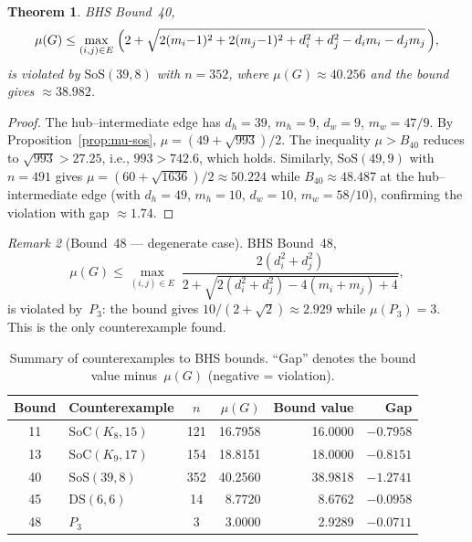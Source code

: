 \documentclass[preprint,12pt]{elsarticle}
\newtheorem{theorem}{Theorem}[section]
\theoremstyle{definition}
\theoremstyle{remark}
\newtheorem{remark}[theorem]{Remark}
\newcommand{\SoC}{\mathrm{SoC}}       %
\newcommand{\SoS}{\mathrm{SoS}}       %
\newcommand{\DS}{\mathrm{DS}}          %
\newcommand{\Lspec}{\mu}               %
\begin{document}

\begin{theorem}\label{thm:bound40}
  BHS Bound~40,
  \begin{equation}\label{eq:bound40}
    \Lspec(G) \leq \max_{(i,j) \in E}\; \Bigl(2 + \sqrt{2(m_i{-}1)^2 + 2(m_j{-}1)^2
      + d_i^2 + d_j^2 - d_i m_i - d_j m_j}\,\Bigr),
  \end{equation}
  is violated by $\SoS(39, 8)$ with $n = 352$, where
  $\Lspec(G) \approx 40.256$ and the bound gives $\approx 38.982$.
\end{theorem}

\begin{proof}
  The hub--intermediate edge has $d_h = 39$, $m_h = 9$,
  $d_w = 9$, $m_w = 47/9$. By Proposition~\ref{prop:mu-sos},
  $\Lspec = (49 + \sqrt{993})/2$. The inequality
  $\Lspec > B_{40}$ reduces to $\sqrt{993} > 27.25$, i.e.,
  $993 > 742.6$, which holds.
  Similarly, $\SoS(49, 9)$ with $n = 491$ gives
  $\Lspec = (60 + \sqrt{1636})/2 \approx 50.224$
  while $B_{40} \approx 48.487$ at the hub--intermediate edge
  (with $d_h = 49$, $m_h = 10$, $d_w = 10$, $m_w = 58/10$),
  confirming the violation with gap $\approx 1.74$.
\end{proof}



\begin{remark}[Bound~48 --- degenerate case]\label{rem:bound48}
  BHS Bound~48,
  \[
    \Lspec(G) \leq \max_{(i,j) \in E}\;
    \frac{2(d_i^2 + d_j^2)}{2 + \sqrt{2(d_i^2 + d_j^2) - 4(m_i + m_j) + 4}},
  \]
  is violated by~$P_3$: the bound gives $10/(2{+}\sqrt{2}) \approx 2.929$
  while $\Lspec(P_3) = 3$. This is the only counterexample found.
\end{remark}



\begin{table}[t]
  \centering
  \caption{Summary of counterexamples to BHS bounds. ``Gap'' denotes
    the bound value minus~$\Lspec(G)$ (negative = violation).}
  \label{tab:counterexamples}
  \begin{tabular}{clcrrr}
    \toprule
    Bound & Counterexample & $n$ & $\Lspec(G)$ & Bound value & Gap \\
    \midrule
    11 & $\SoC(K_8, 15)$     & 121 & 16.7958 & 16.0000 & $-0.7958$ \\
    13 & $\SoC(K_9, 17)$     & 154 & 18.8151 & 18.0000 & $-0.8151$ \\
    40 & $\SoS(39, 8)$       & 352 & 40.2560 & 38.9818 & $-1.2741$ \\
    45 & $\DS(6, 6)$         &  14 &  8.7720 &  8.6762 & $-0.0958$ \\
    48 & $P_3$               &   3 &  3.0000 &  2.9289 & $-0.0711$ \\
    \bottomrule
  \end{tabular}
\end{table}
\end{document}
